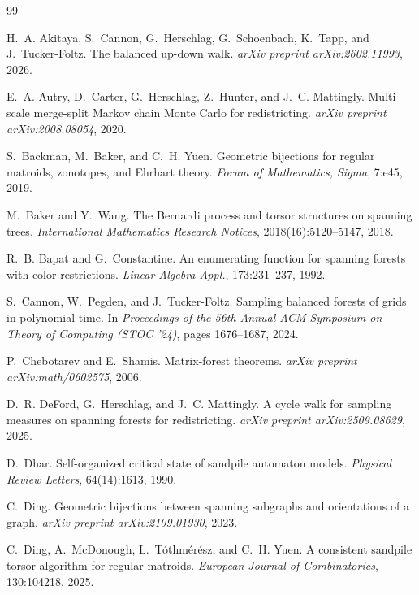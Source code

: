 \documentclass[11pt]{article}
\begin{document}
\begin{thebibliography}{99}

H.~A. Akitaya, S.~Cannon, G.~Herschlag, G.~Schoenbach, K.~Tapp, and
  J.~Tucker-Foltz.
\newblock The balanced up-down walk.
\newblock \emph{arXiv preprint arXiv:2602.11993}, 2026.

E.~A. Autry, D.~Carter, G.~Herschlag, Z.~Hunter, and J.~C. Mattingly.
\newblock Multi-scale merge-split {M}arkov chain {M}onte {C}arlo for
  redistricting.
\newblock \emph{arXiv preprint arXiv:2008.08054}, 2020.

S.~Backman, M.~Baker, and C.~H. Yuen.
\newblock Geometric bijections for regular matroids, zonotopes, and {E}hrhart
  theory.
\newblock \emph{Forum of Mathematics, Sigma}, 7:e45, 2019.

M.~Baker and Y.~Wang.
\newblock The {B}ernardi process and torsor structures on spanning trees.
\newblock \emph{International Mathematics Research Notices}, 2018(16):5120--5147,
  2018.

R.~B. Bapat and G.~Constantine.
\newblock An enumerating function for spanning forests with color restrictions.
\newblock \emph{Linear Algebra Appl.}, 173:231--237, 1992.

S.~Cannon, W.~Pegden, and J.~Tucker-Foltz.
\newblock Sampling balanced forests of grids in polynomial time.
\newblock In \emph{Proceedings of the 56th Annual ACM Symposium on Theory of
  Computing (STOC '24)}, pages 1676--1687, 2024.

P.~Chebotarev and E.~Shamis.
\newblock Matrix-forest theorems.
\newblock \emph{arXiv preprint arXiv:math/0602575}, 2006.

D.~R. DeFord, G.~Herschlag, and J.~C. Mattingly.
\newblock A cycle walk for sampling measures on spanning forests for
  redistricting.
\newblock \emph{arXiv preprint arXiv:2509.08629}, 2025.

D.~Dhar.
\newblock Self-organized critical state of sandpile automaton models.
\newblock \emph{Physical Review Letters}, 64(14):1613, 1990.

C.~Ding.
\newblock Geometric bijections between spanning subgraphs and orientations of a
  graph.
\newblock \emph{arXiv preprint arXiv:2109.01930}, 2023.

C.~Ding, A.~McDonough, L.~T\'othm\'er\'esz, and C.~H. Yuen.
\newblock A consistent sandpile torsor algorithm for regular matroids.
\newblock \emph{European Journal of Combinatorics}, 130:104218, 2025.


\end{thebibliography}
\end{document}
